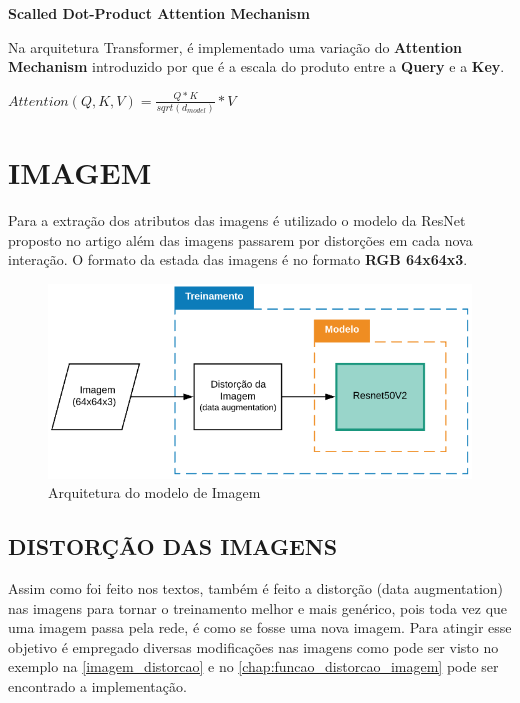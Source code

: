 \textbf{Scalled Dot-Product Attention Mechanism}

Na arquitetura Transformer, é implementado uma variação do \textbf{Attention Mechanism} introduzido por \cite{attention} que é a escala do produto entre a \textbf{Query} e a \textbf{Key}.

\begin{center}
    $Attention(Q, K, V) = \frac{Q * K}{sqrt(d_{model})}*V $
\end{center}

\section{IMAGEM}

Para a extração dos atributos das imagens é utilizado o modelo da ResNet proposto no artigo \cite{resnet} além das imagens passarem por distorções em cada nova interação. O formato da estada das imagens é no formato \textbf{RGB 64x64x3}.

\begin{figure}[]
	\caption{\label{modelo_imagem_macro} Arquitetura do modelo de Imagem}
	\begin{center}
	    \includegraphics[scale=0.5]{artigo/recursos/imagens/modelo_imagem_macro.png}
	\end{center}
\end{figure}


\subsection{DISTORÇÃO DAS IMAGENS}

Assim como foi feito nos textos, também é feito a distorção (data augmentation) nas imagens para tornar o treinamento melhor e mais genérico, pois toda vez que uma imagem passa pela rede, é como se fosse uma nova imagem. Para atingir esse objetivo é empregado diversas modificações nas imagens como pode ser visto no exemplo na \autoref{imagem_distorcao} e no \autoref{chap:funcao_distorcao_imagem} pode ser encontrado a implementação.

